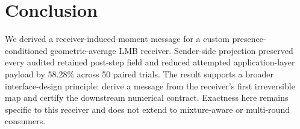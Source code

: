 \section{Conclusion}
\label{sec:conclusion}

We derived a receiver-induced moment message for a custom presence-conditioned
geometric-average LMB receiver. Sender-side projection preserved every audited
retained post-step field and reduced attempted application-layer payload by
58.28\% across 50 paired trials. The result supports a broader interface-design
principle: derive a message from the receiver's first irreversible map and
certify the downstream numerical contract. Exactness here remains specific to
this receiver and does not extend to mixture-aware or multi-round consumers.
